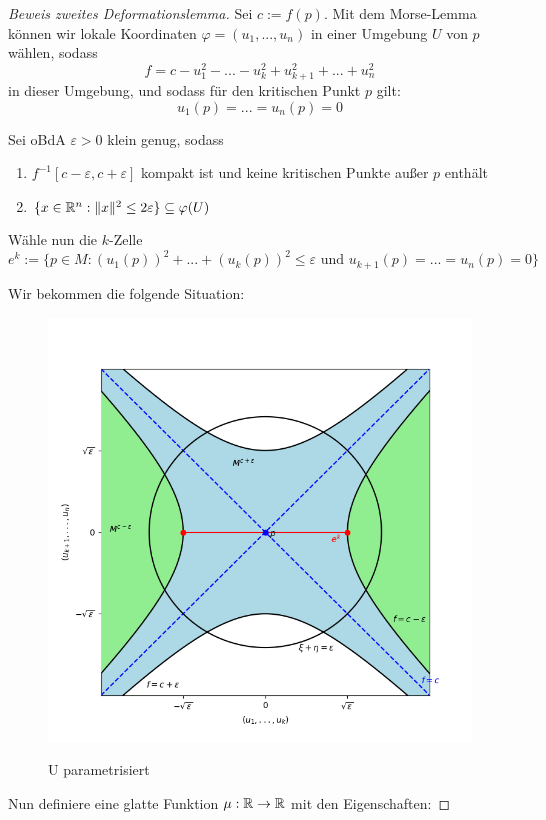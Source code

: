 \begin{proof}[Beweis zweites Deformationslemma]
    Sei $c := f(p)$. Mit dem Morse-Lemma können wir lokale Koordinaten 
    $\varphi = (u_1, ..., u_n)$ in einer Umgebung $U$ von $p$ wählen, sodass
    \[ f = c - u_1^2 - ... - u_k^2 + u_{k+1}^2 + ... + u_n^2 \]
    in dieser Umgebung, und sodass für den kritischen Punkt $p$ gilt:
    \[ u_1(p) = ... = u_n(p) = 0 \]

    Sei oBdA $\varepsilon > 0$ klein genug, sodass 
    \begin{enumerate}
        \item $f^{-1}[c - \varepsilon, c + \varepsilon]$ kompakt ist und keine
            kritischen Punkte außer $p$ enthält
        \item $\{ x \in { \mathbb R }^n: \lVert x \rVert^2 \leq 2 \varepsilon \} \subseteq \varphi(U) $
    \end{enumerate}

    Wähle nun die $k$-Zelle 
    \[ 
        e^k := \{ p \in M: (u_1(p))^2 + ... + (u_k(p))^2 \leq \varepsilon 
        \text{ und } u_{k+1}(p) = ... = u_n(p) = 0 \} 
    \]

    Wir bekommen die folgende Situation:

    \begin{figure}[H]
        \centering
        \includegraphics[width=0.8\linewidth]{resources/Me-Diagram6-U-parameterized.png}
        \label{fig:me-diagram6}
        \caption{U parametrisiert}
    \end{figure}

    Nun definiere eine glatte Funktion $\mu: { \mathbb R } \to { \mathbb R }$ mit den Eigenschaften:


\end{proof}
